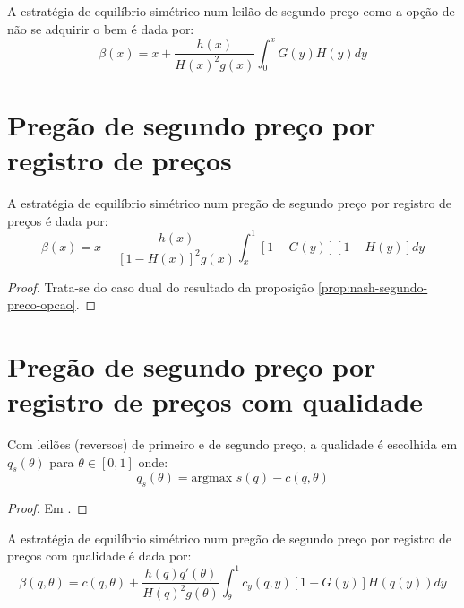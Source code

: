 \begin{proposicao}
	\label{prop:nash-segundo-preco-opcao}
	A estratégia de equilíbrio simétrico num leilão de segundo preço como a opção de não se adquirir o bem é dada por:
	\begin{equation}
		\beta(x) = x + \frac{h(x)}{H(x)^2 g(x)} \int_0^x G(y)H(y)dy
	\end{equation}
\end{proposicao}

\section{Pregão de segundo preço por registro de preços}

\begin{proposicao}
	\label{prop:nash-pregao-segundo-preco-rp}
	A estratégia de equilíbrio simétrico num pregão de segundo preço por registro de preços é dada por:
	\begin{equation}
		\beta(x) = x - \frac{h(x)}{[1-H(x)]^2 g(x)} \int_x^1 [1-G(y)][1-H(y)]dy
	\end{equation}
\end{proposicao}
\begin{proof}
	Trata-se do caso dual do resultado da proposição \ref{prop:nash-segundo-preco-opcao}.
\end{proof}

\section{Pregão de segundo preço por registro de preços com qualidade}

\begin{lema}
	Com leilões (reversos) de primeiro e de segundo preço, a qualidade é escolhida em $q_s(\theta)$ para $\theta \in [0, 1]$ onde:
	\begin{equation}
		q_s(\theta) = \text{argmax } s(q) - c(q, \theta)
	\end{equation}
	\begin{proof}
		Em \citet{Che1993}.
	\end{proof}
\end{lema}

\begin{proposicao}
	\label{prop:nash-pregao-segundo-preco-qualidade}
	A estratégia de equilíbrio simétrico num pregão de segundo preço por registro de preços com qualidade é dada por:
	\begin{equation}
		\beta(q, \theta) = c(q, \theta) + \frac{h(q)q'(\theta)}{H(q)^2g(\theta)}\int_{\theta}^1 c_{y}(q, y)[1-G(y)]H(q(y))dy
	\end{equation}
\end{proposicao}